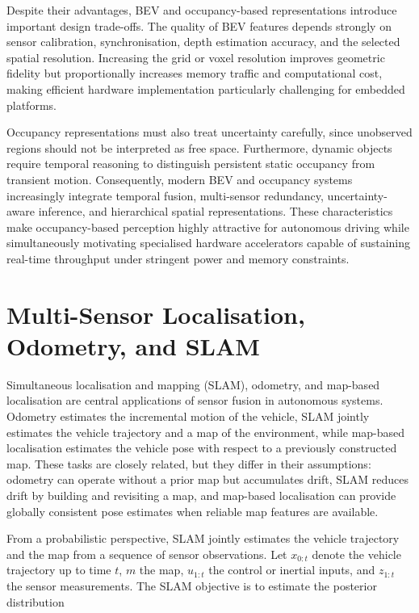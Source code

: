 \documentclass[graybox,envcountchap]{style/SNmono}
\begin{document}
Despite their advantages, BEV and occupancy-based representations introduce important design trade-offs. The quality of BEV features depends strongly on sensor calibration, synchronisation, depth estimation accuracy, and the selected spatial resolution. Increasing the grid or voxel resolution improves geometric fidelity but proportionally increases memory traffic and computational cost, making efficient hardware implementation particularly challenging for embedded platforms.

Occupancy representations must also treat uncertainty carefully, since unobserved regions should not be interpreted as free space. Furthermore, dynamic objects require temporal reasoning to distinguish persistent static occupancy from transient motion. Consequently, modern BEV and occupancy systems increasingly integrate temporal fusion, multi-sensor redundancy, uncertainty-aware inference, and hierarchical spatial representations. These characteristics make occupancy-based perception highly attractive for autonomous driving while simultaneously motivating specialised hardware accelerators capable of sustaining real-time throughput under stringent power and memory constraints.

\section{Multi-Sensor Localisation, Odometry, and SLAM}






Simultaneous localisation and mapping (SLAM), odometry, and map-based localisation are central applications of sensor fusion in autonomous systems. Odometry estimates the incremental motion of the vehicle, SLAM jointly estimates the vehicle trajectory and a map of the environment, while map-based localisation estimates the vehicle pose with respect to a previously constructed map. These tasks are closely related, but they differ in their assumptions: odometry can operate without a prior map but accumulates drift, SLAM reduces drift by building and revisiting a map, and map-based localisation can provide globally consistent pose estimates when reliable map features are available.

From a probabilistic perspective, SLAM jointly estimates the vehicle trajectory and the map from a sequence of sensor observations. Let $x_{0:t}$ denote the vehicle trajectory up to time $t$, $m$ the map, $u_{1:t}$ the control or inertial inputs, and $z_{1:t}$ the sensor measurements. The SLAM objective is to estimate the posterior distribution
\end{document}
